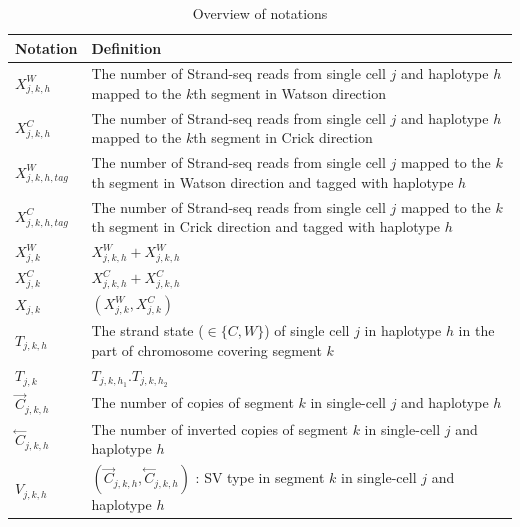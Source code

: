 \documentclass[12pt]{article}
\renewcommand{\j}{j} %
\newcommand{\CN}{C} %
\newcommand{\X}{X} %
\renewcommand{\k}{k} %
\newcommand{\h}{h} %
\newcommand{\T}{T} %
\newcommand{\V}{V} %
\begin{document}
\begin{table}[tb]
	\caption{Overview of notations}
	\centering
	\begin{tabular}{  p{4cm} p{12.5cm} }
		\hline
		Notation & Definition\\
		\hline
		$\X_{\j,\k, \h}^W$ & The number of Strand-seq reads from single cell $\j$ and haplotype $\h$ mapped to the $\k$th segment in Watson direction\\

		$\X_{\j,\k, \h}^C$ & The number of Strand-seq reads from single cell $\j$ and haplotype $\h$ mapped to the $\k$th segment in Crick direction\\
		
		$\X_{\j,\k,\h,tag}^W$ & The number of Strand-seq reads from single cell $\j$  mapped to the $\k$th segment in Watson direction and tagged with haplotype $\h$\\
		
		$\X_{\j,\k,\h,tag}^C$ & The number of Strand-seq reads from single cell $\j$ mapped to the $\k$th segment in Crick direction and tagged with haplotype $\h$\\
		
		$\X_{\j,\k}^W$ & $\X_{\j,\k,\h}^W + \X_{\j,\k,\h}^W$\\
		
		$\X_{\j,\k}^C$ & $\X_{\j,\k,\h}^C + \X_{\j,\k,\h}^C$\\
		
		$\X_{\j,\k}$ & $(\X_{\j,\k}^W, \X_{\j,\k}^C)$\\
		
		$\T_{\j, \k, \h}$ & The strand state ($\in \{C,W\}$) of single cell $\j$ in haplotype $\h$ in the part of chromosome covering segment $\k$\\
		
		$\T_{\j,\k}$ & $\T_{\j, \k, \h_1}.\T_{\j, \k, \h_2}$\\
		
		$\stackrel{\rightarrow}{\CN}_{\j,\k,\h}$ & The number of copies of segment $\k$ in single-cell $\j$ and haplotype $\h$ \\
		
		$\stackrel{\leftarrow}{\CN}_{\j,\k,\h}$ & The number of inverted copies of segment $\k$ in single-cell $\j$ and haplotype $\h$ \\
		
		$\V_{\j, \k, \h}$ &$(\stackrel{\rightarrow}{\CN}_{\j,\k,\h}, \stackrel{\leftarrow}{\CN}_{\j,\k,\h})$ : SV type in segment $\k$ in single-cell $\j$ and haplotype $\h$\\
		

\end{tabular}
\end{table}
\end{document}
